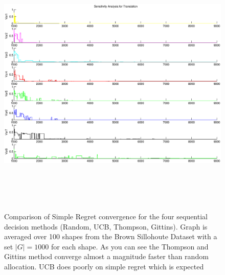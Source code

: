 \documentclass[letterpaper, 10 pt, conference]{ieeeconf}  %
\begin{document}
\begin{figure}[ht!]
\centering
\includegraphics[width = 16.5cm, height = 13cm]{matlab_figures/sensitivity_trans.eps}
\caption{ \footnotesize Comparison of Simple Regret convergence for the four sequential decision methods (Random, UCB, Thompson, Gittins). Graph is averaged over 100 shapes from the Brown Sillohoute Dataset \cite{brown} with a set $|G|=1000$ for each shape. As you can see the Thompson and Gittins method converge almost a magnitude faster than random allocation. UCB does poorly on simple regret which is expected \cite{best_arm}}
\vspace*{-10pt}
\label{fig:simple_regret}
\end{figure}
\end{document}
